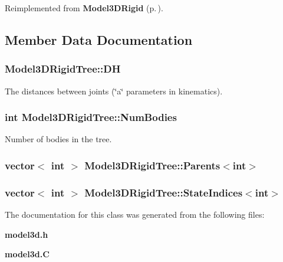 Reimplemented from {\bf Model3DRigid} {\rm (p.\,\pageref{classModel3DRigid_a3})}.

\subsection{Member Data Documentation}
\subsubsection{ Model3DRigid\-Tree::DH}\label{classModel3DRigidTree_m1}


The distances between joints (\char`\"{}a\char`\"{} parameters in kinematics).

\subsubsection{\setlength{\rightskip}{0pt plus 5cm}int Model3DRigid\-Tree::Num\-Bodies}\label{classModel3DRigidTree_m0}


Number of bodies in the tree.

\subsubsection{\setlength{\rightskip}{0pt plus 5cm}vector$<$ int $>$ Model3DRigid\-Tree::Parents$<$int$>$}\label{classModel3DRigidTree_m3}


\subsubsection{\setlength{\rightskip}{0pt plus 5cm}vector$<$ int $>$ Model3DRigid\-Tree::State\-Indices$<$int$>$}\label{classModel3DRigidTree_m2}




The documentation for this class was generated from the following files:\begin{CompactItemize}
\item 
{\bf model3d.h}\item 
{\bf model3d.C}\end{CompactItemize}
